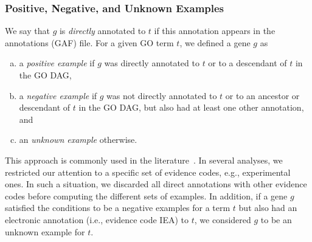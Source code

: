 
\subsubsection{Positive, Negative, and Unknown Examples}
\label{sec:pos-neg-unk-examples}
We say that $g$ is \emph{directly} annotated to $t$ if this annotation appears in the annotations (GAF) file. For a given GO term $t$, we defined a gene $g$ as 
\begin{enumerate}[(a)]
    \item a \emph{positive example} if $g$ was directly annotated to $t$ or to a descendant of $t$ in the GO DAG, 
    \item a \emph{negative example} if $g$ was not directly annotated to $t$ or to an ancestor or descendant of $t$ in the GO DAG, but also had at least one other annotation, and 
    \item an \emph{unknown example} otherwise.
\end{enumerate}
This approach is commonly used in the literature~\cite{mostafavi-morris-genemania-gb-2008}.
In several analyses, we restricted our attention to a specific set of evidence codes, e.g., experimental ones. In such a situation, we discarded all direct annotations with other evidence codes before computing the different sets of examples.
In addition, if a gene $g$ satisfied the conditions to be a negative examples for a term $t$ but also had an electronic annotation (i.e., evidence code IEA) to $t$, we considered $g$ to be an unknown example for $t$.

